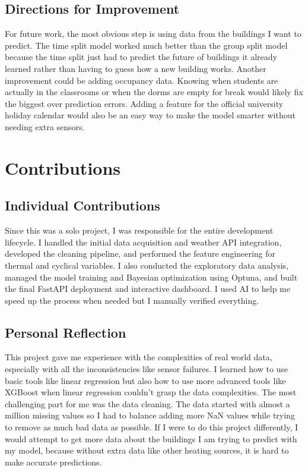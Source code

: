 \documentclass[conference]{IEEEtran}
\begin{document}
\subsection{Directions for Improvement} 
For future work, the most obvious step is using data from the buildings I want to predict. The time split model worked much better than the group split model because the time split just had to predict the future of buildings it already learned rather than having to guess how a new building works.
Another improvement could be adding occupancy data. Knowing when students are actually in the classrooms or when the dorms are empty for break would likely fix the biggest over prediction errors. Adding a feature for the official university holiday calendar would also be an easy way to make the model smarter without needing extra sensors.





\section{Contributions}
\subsection{Individual Contributions}
Since this was a solo project, I was responsible for the entire development lifecycle. I handled the initial data acquisition and weather API integration, developed the cleaning pipeline, and performed the feature engineering for thermal and cyclical variables. I also conducted the exploratory data analysis, managed the model training and Bayesian optimization using Optuna, and built the final FastAPI deployment and interactive dashboard. I used AI to help me speed up the process when needed but I manually verified everything.
\subsection{Personal Reflection}
This project gave me experience with the complexities of real world data, especially with all the inconsistencies like sensor failures. I learned how to use basic tools like linear regression but also how to use more advanced tools like XGBoost when linear regression couldn’t grasp the data complexities. The most challenging part for me was the data cleaning. The data started with almost a million missing values so I had to balance adding more NaN values while trying to remove as much bad data as possible. If I were to do this project differently, I would attempt to get more data about the buildings I am trying to predict with my model, because without extra data like other heating sources, it is hard to make accurate predictions.
\end{document}
